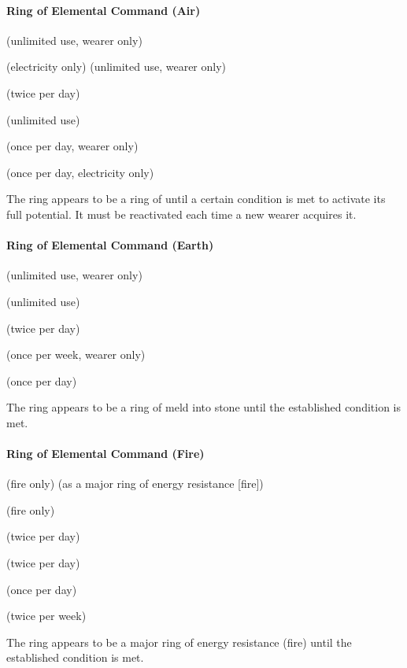 \paragraph{Ring of Elemental Command (Air)}
\begin{list}{}{\leftmargin=1em}
\item {} (unlimited use, wearer only)
\item {} (electricity only) (unlimited use, wearer only)
\item {} (twice per day)
\item {} (unlimited use)
\item {} (once per day, wearer only)
\item {} (once per day, electricity only)
\end{list}
The ring appears to be a ring of  until a certain condition is met to activate its full potential. It must be reactivated each time a new wearer acquires it.

\paragraph{Ring of Elemental Command (Earth)}
\begin{list}{}{\leftmargin=1em}
\item {} (unlimited use, wearer only)
\item {} (unlimited use)
\item {} (twice per day)
\item {} (once per week, wearer only)
\item {} (once per day)
\end{list}
The ring appears to be a ring of meld into stone until the established condition is met.

\paragraph{Ring of Elemental Command (Fire)}
\begin{list}{}{\leftmargin=1em}
\item {} (fire only) (as a major ring of energy resistance [fire])
\item {} (fire only)
\item {} (twice per day)
\item {} (twice per day)
\item {}  (once per day)
\item {} (twice per week)
\end{list}
The ring appears to be a major ring of energy resistance (fire) until the established condition is met.

